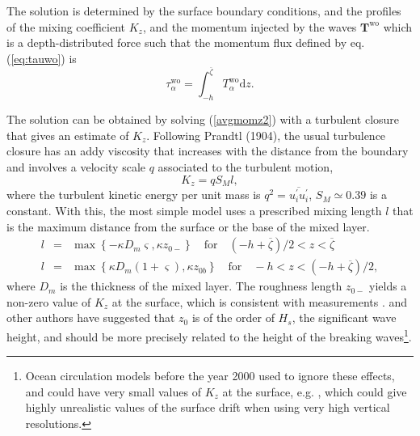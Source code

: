 The solution is determined by the surface boundary conditions, and the profiles of the mixing coefficient $K_z$,  
and the momentum injected by the waves ${\mathbf T}^{\mathrm{wo}}$ which is a depth-distributed force such that the momentum flux defined by eq. (\ref{eq:tauwo}) is 
\begin{equation}
\tau^{\mathrm{wo}}_{\alpha} = \int_{-h}^{\overline{\zeta}} T^{\mathrm{wo}}_{\alpha} {\mathrm d}z.
 \end{equation}
 
The solution can be obtained by solving  (\ref{avgmomz2}) with a turbulent closure that gives an estimate of  $K_z$. 
Following Prandtl (1904), the usual turbulence closure has an addy viscosity that increases with the distance from the boundary 
\citep{Schlichting1979} and involves a velocity scale $q$ associated to the turbulent motion, 
\begin{equation}
K_z = q S_M l,
\end{equation}
where the turbulent kinetic energy per unit mass is  $q^2 = \overline{u^\prime_i u^\prime_i}$, $S_M \simeq 0.39$ is a constant. 
With this, the  most simple model uses a prescribed mixing length $l$ that is the maximum distance from the surface or the base of the mixed layer. 
\begin{eqnarray}
l &= &\max\left\{-\kappa D_m \varsigma, \kappa  z_{0-}\right\} \quad
\textrm{for}
\quad (-h+\overline{\zeta})/2 < z < \overline{\zeta} \nonumber\\
l &= &\max\left\{\kappa D_m (1+\varsigma), \kappa z_{0b}\right\} \quad
\textrm{for} \quad   -h < z  <(-h+\overline{\zeta})/2 ,
\end{eqnarray}
where $D_m$ is the thickness of the mixed layer. The roughness length  $z_{0-}$ yields a non-zero value of  $K_z$ at the surface, 
  which is consistent with measurements \citep[e.g.][]{Kitaigorodskii1994}. \cite{Thorpe&al.2003a} 
  and other authors have suggested that $z_0$ is of the order of  $H_s$, the significant wave height, and should be more precisely related to the height of the breaking waves\footnote{Ocean circulation models before the year 2000 
  used to ignore these effects, and could have very small values of $K_z$ at the surface, e.g. \citet{Large&al.1994}, 
which could give highly unrealistic values of the surface drift when using very high vertical resolutions.}. 

